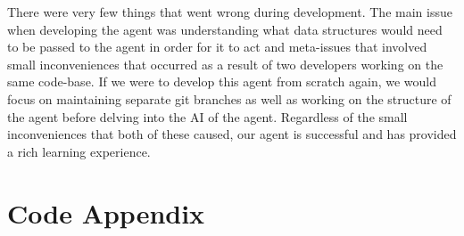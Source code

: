\documentclass[10pt, a4paper, twocolumn]{article} %
\begin{document}
	There were very few things that went wrong during development. The main issue when developing the agent was understanding what data structures would need to be passed to the agent in order for it to act and meta-issues that involved small inconveniences that occurred as a result of two developers working on the same code-base. If we were to develop this agent from scratch again, we would focus on maintaining separate git branches as well as working on the structure of the agent before delving into the AI of the agent. Regardless of the small inconveniences that both of these caused, our agent is successful and has provided a rich learning experience.



\printbibliography[title={Bibliography}] %
\newpage
\onecolumn
\section{Code Appendix}

\end{document}
